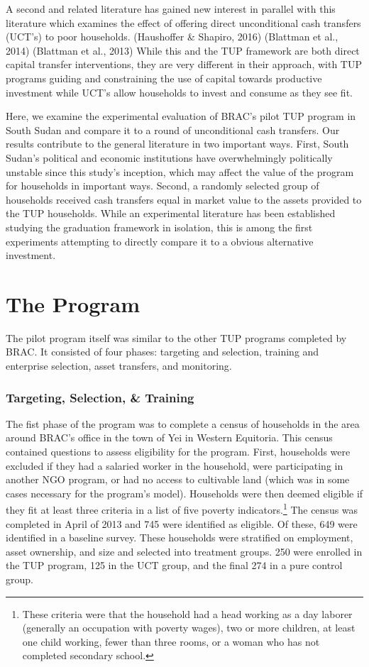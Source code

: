 \documentclass[12pt,article]{article}
\begin{document}
A second and related literature has gained new interest in parallel with this
literature which examines the effect of offering direct unconditional cash transfers
(UCT's) to poor households. (Haushoffer \& Shapiro, 2016) (Blattman et al., 2014)
(Blattman et al., 2013) While this and the TUP framework are both direct capital transfer
interventions, they are very different in their approach, with TUP programs guiding
and constraining the use of capital towards productive investment while UCT's allow
households to invest and consume as they see fit.

Here, we examine the experimental evaluation of BRAC's pilot TUP program in South
Sudan and compare it to a round of unconditional cash transfers. Our results
contribute to the general literature in two important ways. First, South Sudan's
political and economic institutions have overwhelmingly politically unstable since
this study's inception, which may affect the value of the program for
households in important ways. Second, a randomly selected group of households
received cash transfers equal in market value to the assets provided to the TUP
households. While an experimental literature has been established studying the
graduation framework in isolation, this is among the first experiments attempting to
directly compare it to a obvious alternative investment.

\section{The Program}
\label{sec:orgheadline6}

The pilot program itself was similar to the other TUP programs completed by BRAC. It
consisted of four phases: targeting and selection, training and enterprise selection,
asset transfers, and monitoring. 

\subsubsection{Targeting, Selection, \& Training}
\label{sec:orgheadline2}

The fist phase of the program was to complete a census of households in the area
around BRAC's office in the town of Yei in Western Equitoria. This census contained
questions to assess eligibility for the program. First, households were excluded if
they had a salaried worker in the household, were participating in another NGO
program, or had no access to cultivable land (which was in some cases necessary for
the program's model). Households were then deemed eligible if they fit at least three
criteria in a list of five poverty indicators.\footnote{These criteria were that the
household had a head working as a day laborer (generally an occupation with poverty
wages), two or more children, at least one child working, fewer than three rooms, or
a woman who has not completed secondary school.} The census was completed in April of
2013 and 745 were identified as eligible. Of these, 649 were identified in a baseline
survey. These households were stratified on employment, asset ownership, and size and
selected into treatment groups. 250 were enrolled in the TUP program, 125 in the UCT
group, and the final 274 in a pure control group.
\end{document}
